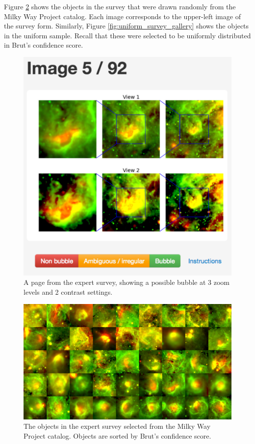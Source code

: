 Figure \ref{fig:mwp_survey_gallery} shows the objects in the survey that were drawn randomly from the Milky Way Project catalog. Each image corresponds to the upper-left image of the survey form. Similarly, Figure \ref{fig:uniform_survey_gallery} shows the objects in the uniform sample. Recall that these were selected to be uniformly distributed in Brut's confidence score.


\begin{figure}
\includegraphics[width=5in]{expert_form}
\caption{A page from the expert survey, showing a possible bubble at 3 zoom levels and 2 contrast settings.}
\label{fig:expert_form}
\end{figure}


\begin{figure}
\includegraphics[width=6in]{mwp_survey_gallery}
\caption{The objects in the expert survey selected from the Milky Way Project catalog. Objects are sorted by Brut's confidence score.}
\label{fig:mwp_survey_gallery}
\end{figure}

